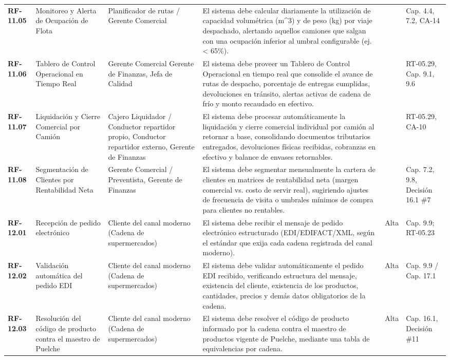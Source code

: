 \begin{longtable}{p{1.7cm} p{2.3cm} p{1.9cm} p{5.0cm} p{1.1cm} p{1.9cm}}
\textbf{RF-11.05} & Monitoreo y Alerta de Ocupación de Flota & Planificador de rutas / Gerente Comercial & El sistema debe calcular diariamente la utilización de capacidad volumétrica (m\textasciicircum{}3) y de peso (kg) por viaje despachado, alertando aquellos camiones que salgan con una ocupación inferior al umbral configurable (ej. < 65\%). &  & Cap. 4.4, 7.2, CA-14 \\
\textbf{RF-11.06} & Tablero de Control Operacional en Tiempo Real & Gerente Comercial Gerente de Finanzas, Jefa de Calidad & El sistema debe proveer un Tablero de Control Operacional en tiempo real que consolide el avance de rutas de despacho, porcentaje de entregas cumplidas, devoluciones en tránsito, alertas activas de cadena de frío y monto recaudado en efectivo. &  & RT-05.29, Cap. 9.1, 9.6 \\
\textbf{RF-11.07} & Liquidación y Cierre Comercial por Camión & Cajero Liquidador / Conductor repartidor propio, Conductor repartidor externo, Gerente de Finanzas & El sistema debe procesar automáticamente la liquidación y cierre comercial individual por camión al retornar a base, consolidando documentos tributarios entregados, devoluciones físicas recibidas, cobranzas en efectivo y balance de envases retornables. &  & RT-05.29, CA-10 \\
\textbf{RF-11.08} & Segmentación de Clientes por Rentabilidad Neta & Gerente Comercial / Preventista, Gerente de Finanzas & El sistema debe segmentar mensualmente la cartera de clientes en matrices de rentabilidad neta (margen comercial vs. costo de servir real), sugiriendo ajustes de frecuencia de visita o umbrales mínimos de compra para clientes no rentables. &  & Cap. 7.2, 9.8, Decisión 16.1 \#7 \\
\textbf{RF-12.01} & Recepción de pedido electrónico & Cliente del canal moderno (Cadena de supermercados) & El sistema debe recibir el mensaje de pedido electrónico estructurado (EDI/EDIFACT/XML, según el estándar que exija cada cadena registrada del canal moderno). & Alta & Cap. 9.9; RT-05.23 \\
\textbf{RF-12.02} & Validación automática del pedido EDI & Cliente del canal moderno (Cadena de supermercados) & El sistema debe validar automáticamente el pedido EDI recibido, verificando estructura del mensaje, existencia del cliente, existencia de los productos, cantidades, precios y demás datos obligatorios de la cadena. & Alta & Cap. 9.9 / Cap. 17.1 \\
\textbf{RF-12.03} & Resolución del código de producto contra el maestro de Puelche & Cliente del canal moderno (Cadena de supermercados) & El sistema debe resolver el código de producto informado por la cadena contra el maestro de productos vigente de Puelche, mediante una tabla de equivalencias por cadena. & Alta & Cap. 16.1, Decisión \#11 \\

\end{longtable}
